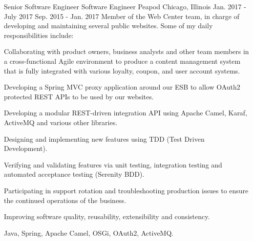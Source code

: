\begin{cventries}
  \cventryfour
    {Senior Software Engineer} %
    {Software Engineer} %
    {Peapod} %
    {Chicago, Illinois} %
    {Jan. 2017 - July 2017} %
    {Sep. 2015 - Jan. 2017} %
    {Member of the Web Center team, in charge of developing and maintaining several public websites. Some of my daily responsibilities include:} %
    {
    \begin{cvitems}
  \item Collaborating with product owners, business analysts and other team members in a cross-functional Agile environment to produce a content management system that is fully integrated with various loyalty, coupon, and user account systems.
  \item Developing a Spring MVC proxy application around our ESB to allow OAuth2 protected REST APIs to be used by our websites.
  \item Developing a modular REST-driven integration API using Apache Camel, Karaf, ActiveMQ and various other libraries.
  \item Designing and implementing new features using TDD (Test Driven Development).
  \item Verifying and validating features via unit testing, integration testing and automated acceptance testing (Serenity BDD).
  \item Participating in support rotation and troubleshooting production issues to ensure the continued operations of the business.
  \item Improving software quality, reusability, extensibility and consistency.
\end{cvitems}
    } %
    {Java, Spring, Apache Camel, OSGi, OAuth2, ActiveMQ.}
  

\end{cventries}
